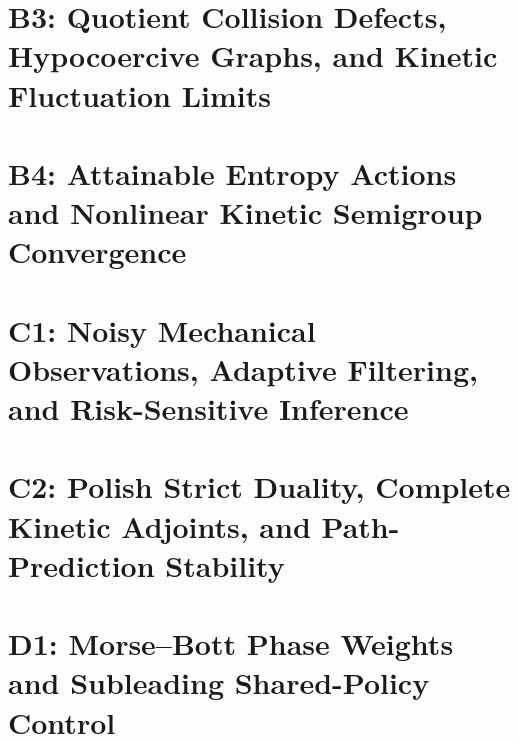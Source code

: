 \documentclass[10pt,reqno]{amsart}
\theoremstyle{definition}
\theoremstyle{remark}
\begin{document}
\clearpage\part{B3: Quotient Collision Defects, Hypocoercive Graphs, and Kinetic Fluctuation Limits}

\clearpage\part{B4: Attainable Entropy Actions and Nonlinear Kinetic Semigroup Convergence}

\clearpage\part{C1: Noisy Mechanical Observations, Adaptive Filtering, and Risk-Sensitive Inference}

\clearpage\part{C2: Polish Strict Duality, Complete Kinetic Adjoints, and Path-Prediction Stability}

\clearpage\part{D1: Morse--Bott Phase Weights and Subleading Shared-Policy Control}

\end{document}
